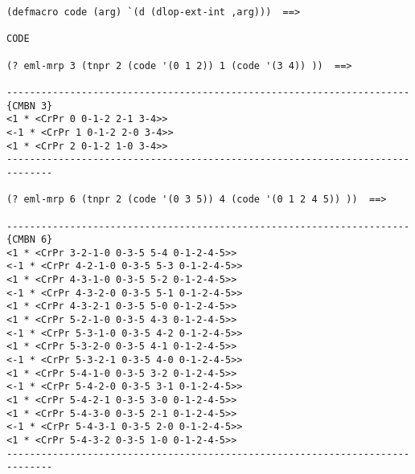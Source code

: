 {\footnotesize\begin{verbatim} 
(defmacro code (arg) `(d (dlop-ext-int ,arg)))  ==>

CODE

(? eml-mrp 3 (tnpr 2 (code '(0 1 2)) 1 (code '(3 4)) ))  ==>

----------------------------------------------------------------------{CMBN 3}
<1 * <CrPr 0 0-1-2 2-1 3-4>>
<-1 * <CrPr 1 0-1-2 2-0 3-4>>
<1 * <CrPr 2 0-1-2 1-0 3-4>>
------------------------------------------------------------------------------

(? eml-mrp 6 (tnpr 2 (code '(0 3 5)) 4 (code '(0 1 2 4 5)) ))  ==>

----------------------------------------------------------------------{CMBN 6}
<1 * <CrPr 3-2-1-0 0-3-5 5-4 0-1-2-4-5>>
<-1 * <CrPr 4-2-1-0 0-3-5 5-3 0-1-2-4-5>>
<1 * <CrPr 4-3-1-0 0-3-5 5-2 0-1-2-4-5>>
<-1 * <CrPr 4-3-2-0 0-3-5 5-1 0-1-2-4-5>>
<1 * <CrPr 4-3-2-1 0-3-5 5-0 0-1-2-4-5>>
<1 * <CrPr 5-2-1-0 0-3-5 4-3 0-1-2-4-5>>
<-1 * <CrPr 5-3-1-0 0-3-5 4-2 0-1-2-4-5>>
<1 * <CrPr 5-3-2-0 0-3-5 4-1 0-1-2-4-5>>
<-1 * <CrPr 5-3-2-1 0-3-5 4-0 0-1-2-4-5>>
<1 * <CrPr 5-4-1-0 0-3-5 3-2 0-1-2-4-5>>
<-1 * <CrPr 5-4-2-0 0-3-5 3-1 0-1-2-4-5>>
<1 * <CrPr 5-4-2-1 0-3-5 3-0 0-1-2-4-5>>
<1 * <CrPr 5-4-3-0 0-3-5 2-1 0-1-2-4-5>>
<-1 * <CrPr 5-4-3-1 0-3-5 2-0 0-1-2-4-5>>
<1 * <CrPr 5-4-3-2 0-3-5 1-0 0-1-2-4-5>>
------------------------------------------------------------------------------
\end{verbatim}}
\newpage
%
\vskip 0.40cm
\centerline{}
\vskip 0.40cm
%

